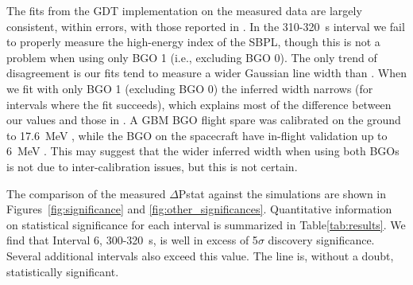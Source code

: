 \documentclass{aastex61}
\begin{document}
The fits from the GDT implementation on the measured data are largely consistent, within errors, with those reported in \citet{ravasio2024mega}. In the 310-320~s interval we fail to properly measure the high-energy index of the SBPL, though this is not a problem when using only BGO 1 (i.e., excluding BGO 0). The only trend of disagreement is our fits tend to measure a wider Gaussian line width than \citet{ravasio2024mega}. When we fit with only BGO 1 (excluding BGO 0) the inferred width narrows (for intervals where the fit succeeds), which explains most of the difference between our values and those in \citet{ravasio2024mega}. A GBM BGO flight spare was calibrated on the ground to 17.6~MeV \citep{bissaldi2009ground}, while the BGO on the spacecraft have in-flight validation up to 6~MeV \citep{ackermann2012fermi}. This may suggest that the wider inferred width when using both BGOs is not due to inter-calibration issues, but this is not certain.

The comparison of the measured $\Delta$Pstat against the simulations are shown in Figures~\ref{fig:significance} and \ref{fig:other_significances}. Quantitative information on statistical significance for each interval is summarized in Table\ref{tab:results}. We find that Interval 6, 300-320~s, is well in excess of 5$\sigma$ discovery significance. Several additional intervals also exceed this value. The line is, without a doubt, statistically significant.
\end{document}
